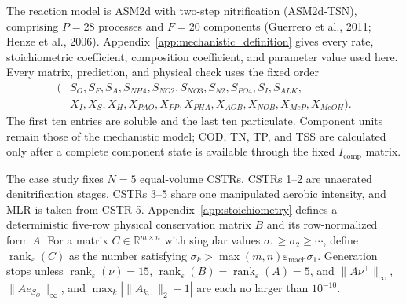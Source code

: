 \documentclass[a4paper,fleqn]{cas-sc}
\newcommand{\R}{\mathbb{R}}
\begin{document}
The reaction model is ASM2d with two-step nitrification (ASM2d-TSN), comprising $P=28$ processes and $F=20$ components (Guerrero et al., 2011; Henze et al., 2006). Appendix~\ref{app:mechanistic_definition} gives every rate, stoichiometric coefficient, composition coefficient, and parameter value used here. Every matrix, prediction, and physical check uses the fixed order
\begin{equation}
\label{eq:component_order}
\begin{split}
(&S_O,S_F,S_A,S_{NH4},S_{NO2},S_{NO3},S_{N2},S_{PO4},S_I,S_{ALK},\\
&X_I,X_S,X_H,X_{PAO},X_{PP},X_{PHA},X_{AOB},X_{NOB},X_{MeP},X_{MeOH}).
\end{split}
\end{equation}
The first ten entries are soluble and the last ten particulate. Component units remain those of the mechanistic model; COD, TN, TP, and TSS are calculated only after a complete component state is available through the fixed $I_{\mathrm{comp}}$ matrix.

The case study fixes $N=5$ equal-volume CSTRs. CSTRs 1--2 are unaerated denitrification stages, CSTRs 3--5 share one manipulated aerobic intensity, and MLR is taken from CSTR 5. Appendix~\ref{app:stoichiometry} defines a deterministic five-row physical conservation matrix $B$ and its row-normalized form $A$. For a matrix $C\in\R^{m\times n}$ with singular values $\sigma_1\geq\sigma_2\geq\cdots$, define $\operatorname{rank}_\varepsilon(C)$ as the number satisfying $\sigma_k>\max(m,n)\varepsilon_{\mathrm{mach}}\sigma_1$. Generation stops unless $\operatorname{rank}_\varepsilon(\nu)=15$, $\operatorname{rank}_\varepsilon(B)=\operatorname{rank}_\varepsilon(A)=5$, and $\|A\nu^\top\|_\infty$, $\|Ae_{S_O}\|_\infty$, and $\max_k|\|A_{k,:}\|_2-1|$ are each no larger than $10^{-10}$.
\end{document}
